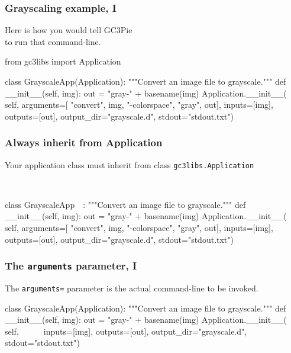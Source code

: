 \documentclass[english,serif,mathserif,xcolor=pdftex,dvipsnames,table]{beamer}
\begin{document}
\begin{frame}[fragile]
\frametitle{Grayscaling example, I}

  Here is how you would tell GC3Pie \\ to run that command-line.

\begin{python}
from gc3libs import Application

class GrayscaleApp(Application):
  """Convert an image file to grayscale."""
  def __init__(self, img):
    out = "gray-" + basename(img)
    Application.__init__(
      self,
      arguments=[
        "convert", img, "-colorspace", "gray", out],
      inputs=[img],
      outputs=[out],
      output_dir="grayscale.d",
      stdout="stdout.txt")
\end{python}
\end{frame}


\begin{frame}[fragile]
\frametitle{Always inherit from Application}

  Your application class must inherit from class \texttt{gc3libs.Application}
  \+
\begin{python}
~~

class GrayscaleApp~~:
  """Convert an image file to grayscale."""
  def __init__(self, img):
    out = "gray-" + basename(img)
    Application.__init__(
      self,
      arguments=[
        "convert", img, "-colorspace", "gray", out],
      inputs=[img],
      outputs=[out],
      output_dir="grayscale.d",
      stdout="stdout.txt")
\end{python}
\end{frame}


\begin{frame}[fragile]
  \frametitle{The \texttt{arguments} parameter, I}

  The \texttt{arguments=} parameter is the actual command-line to be invoked.

  \+
\begin{python}
class GrayscaleApp(Application):
  """Convert an image file to grayscale."""
  def __init__(self, img):
    out = "gray-" + basename(img)
    Application.__init__(
      self,
      ~\HL{arguments=[}~
        ~\HL{"convert", img, "-colorspace", "gray", out],}~
      inputs=[img],
      outputs=[out],
      output_dir="grayscale.d",
      stdout="stdout.txt")
\end{python}
\end{frame}
\end{document}
